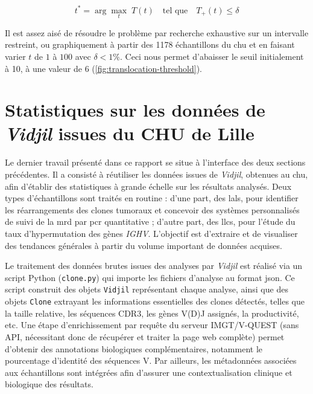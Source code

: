 \begin{equation}
    t^* = \arg\max_{t} \; T(t) \quad \text{tel que} \quad T_{+}(t) \leq \delta
 \end{equation}
    
 Il est assez aisé de résoudre le problème par recherche exhaustive sur un intervalle restreint, ou graphiquement à partir des 1178 échantillons du \gls{chu} et en faisant varier 
 $t$ de $1$ à $100$ avec $\delta < 1 \%$. Ceci nous permet d'abaisser le seuil initialement à 10, à une valeur de 6 (\autoref{fig:translocation-threshold}).



\section{Statistiques sur les données de \textit{Vidjil} issues du CHU de Lille}

Le dernier travail présenté dans ce rapport se situe à l'interface des deux sections précédentes. Il a consisté à réutiliser les données issues de \textit{Vidjil}, obtenues au \gls{chu}, 
afin d'établir des statistiques à grande échelle sur les résultats analysés. Deux types d'échantillons sont traités en routine : d'une part, des \glspl{lal}, pour identifier les 
réarrangements des clones tumoraux et concevoir des systèmes personnalisés de suivi de la \gls{mrd} par \gls{pcr} quantitative ; d'autre part, des \glspl{llc}, pour l'étude du taux 
d'hypermutation des gènes \textit{IGHV}. L'objectif est d'extraire et de visualiser des tendances générales à partir du volume important de données acquises.

\vspace{1em}

Le traitement des données brutes issues des analyses par \textit{Vidjil} est réalisé via un script Python (\texttt{clone.py}) qui importe les fichiers d'analyse au format \gls{json}. 
Ce script construit des objets \texttt{Vidjil} représentant chaque analyse, ainsi que des objets \texttt{Clone} extrayant les informations essentielles des clones détectés, 
telles que la taille relative, les séquences CDR3, les gènes V(D)J assignés, la productivité, etc. Une étape d'enrichissement par requête du serveur IMGT/V-QUEST 
(sans API, nécessitant donc de récupérer et traiter la page web complète) permet d'obtenir des annotations biologiques complémentaires, notamment le pourcentage d'identité des séquences V.
Par ailleurs, les métadonnées associées aux échantillons sont intégrées afin d'assurer une contextualisation clinique et biologique des résultats.


